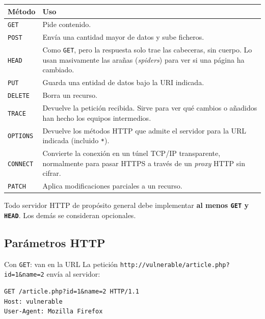 \documentclass[11pt,a4paper]{report}
\begin{document}
\begin{center}
\small
{\setlength{\aboverulesep}{0pt}\setlength{\belowrulesep}{0pt}\renewcommand{\arraystretch}{1.3}%
\begin{tabularx}{\linewidth}{>{\raggedright\arraybackslash}p{2.0cm} !{\color{gray!45}\vrule width 0.2pt} >{\raggedright\arraybackslash}X}
\toprule
\textbf{Método} & \textbf{Uso} \\
\midrule
\texttt{GET} & Pide contenido. \\
\texttt{POST} & Envía una cantidad mayor de datos y sube ficheros. \\
\texttt{HEAD} & Como \texttt{GET}, pero la respuesta solo trae las cabeceras, sin cuerpo. Lo usan masivamente las arañas (\emph{spiders}) para ver si una página ha cambiado. \\
\texttt{PUT} & Guarda una entidad de datos bajo la URI indicada. \\
\texttt{DELETE} & Borra un recurso. \\
\texttt{TRACE} & Devuelve la petición recibida. Sirve para ver qué cambios o añadidos han hecho los equipos intermedios. \\
\texttt{OPTIONS} & Devuelve los métodos HTTP que admite el servidor para la URL indicada (incluido \texttt{*}). \\
\texttt{CONNECT} & Convierte la conexión en un túnel TCP/IP transparente, normalmente para pasar HTTPS a través de un \emph{proxy} HTTP sin cifrar. \\
\texttt{PATCH} & Aplica modificaciones parciales a un recurso. \\
\bottomrule
\end{tabularx}}
\end{center}
 
Todo servidor HTTP de propósito general debe implementar \textbf{al menos \texttt{GET} y \texttt{HEAD}}. Los demás se consideran opcionales.
 
\subsection{Parámetros HTTP}
 
\begin{ejemplo}{Con \texttt{GET}: van en la URL}
La petición \texttt{http://vulnerable/article.php?id=1\&name=2} envía al servidor:
\begin{verbatim}
GET /article.php?id=1&name=2 HTTP/1.1
Host: vulnerable
User-Agent: Mozilla Firefox
\end{verbatim}
\end{ejemplo}
 
\end{document}
